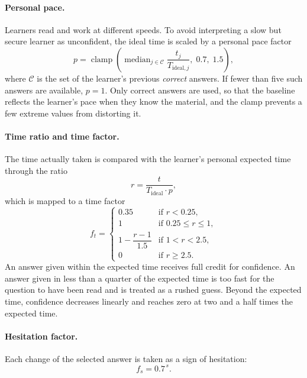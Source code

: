 \documentclass[12pt,a4paper,oneside]{report}
\begin{document}
\paragraph{Personal pace.} Learners read and work at different speeds. To
avoid interpreting a slow but secure learner as unconfident, the ideal time
is scaled by a personal pace factor
\begin{equation}
  p = \operatorname{clamp}\!\left(
      \operatorname{median}_{j \in \mathcal{C}} \frac{t_j}{T_{\mathrm{ideal},j}},
      \; 0.7,\; 1.5 \right),
  \label{eq:pace}
\end{equation}
where $\mathcal{C}$ is the set of the learner's previous \emph{correct}
answers. If fewer than five such answers are available, $p = 1$. Only
correct answers are used, so that the baseline reflects the learner's pace
when they know the material, and the clamp prevents a few extreme values
from distorting it.

\paragraph{Time ratio and time factor.} The time actually taken is
compared with the learner's personal expected time through the ratio
\begin{equation}
  r = \frac{t}{T_{\mathrm{ideal}} \cdot p},
  \label{eq:ratio}
\end{equation}
which is mapped to a time factor
\begin{equation}
  f_t =
  \begin{cases}
    0.35 & \text{if } r < 0.25, \\
    1 & \text{if } 0.25 \le r \le 1, \\
    1 - \dfrac{r - 1}{1.5} & \text{if } 1 < r < 2.5, \\
    0 & \text{if } r \ge 2.5 .
  \end{cases}
  \label{eq:timefactor}
\end{equation}
An answer given within the expected time receives full credit for
confidence. An answer given in less than a quarter of the expected time
is too fast for the question to have been read and is treated as a rushed
guess. Beyond the expected time, confidence decreases linearly and reaches
zero at two and a half times the expected time.

\paragraph{Hesitation factor.} Each change of the selected answer is taken
as a sign of hesitation:
\begin{equation}
  f_s = 0.7^{\,s}.
  \label{eq:hesitation}
\end{equation}
\end{document}
